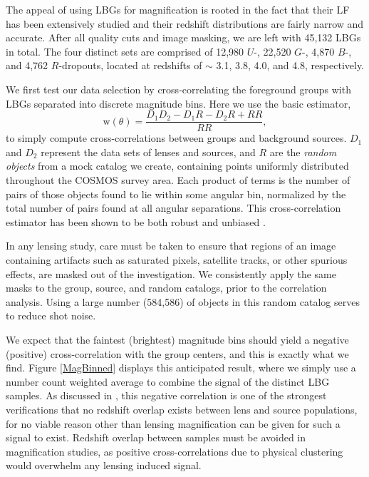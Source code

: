 The appeal of using \ac{LBG}s for magnification is rooted in the fact that their \acf{LF} has been extensively studied and their redshift distributions are fairly narrow and accurate.  After all quality cuts and image masking, we are left with 45,132 \ac{LBG}s in total.  The four distinct sets are comprised of 12,980 $U$-, 22,520 $G$-, 4,870 $B$-, and 4,762 $R$-dropouts, located at redshifts of $\sim$ 3.1, 3.8, 4.0, and 4.8, respectively.

We first test our data selection by cross-correlating the foreground groups with \ac{LBG}s separated into discrete magnitude bins. Here we use the basic \citet{LandySzalay93} estimator, 
\begin{equation}
\mathrm{w}(\theta)=\frac{D_1 D_2 - D_1 R - D_2 R + RR}{RR},
\end{equation}
to simply compute cross-correlations between groups and background sources. $D_1$ and $D_2$ represent the data sets of lenses and sources, and $R$ are the {\it random objects} from a mock catalog we create, containing points uniformly distributed throughout the \ac{COSMOS} survey area. Each product of terms is the number of pairs of those objects found to lie within some angular bin, normalized by the total number of pairs found at all angular separations.  This cross-correlation estimator has been shown to be both robust and unbiased \citep{Kerscher00}.  

In any lensing study, care must be taken to ensure that regions of an image containing artifacts such as saturated pixels, satellite tracks, or other spurious effects, are masked out of the investigation.  We consistently apply the same masks to the group, source, and random catalogs, prior to the correlation analysis. Using a large number (584,586) of objects in this random catalog serves to reduce shot noise.  

We expect that the faintest (brightest) magnitude bins should yield a negative (positive) cross-correlation with the group centers, and this is exactly what we find.  Figure \ref{MagBinned} displays this anticipated result, where we simply use a number count weighted average to combine the signal of the distinct \ac{LBG} samples.  As discussed in \citet{Hildebrandt09b}, this negative correlation is one of the strongest verifications that no redshift overlap exists between lens and source populations, for no viable reason other than lensing magnification can be given for such a signal to exist.  Redshift overlap between samples must be avoided in magnification studies, as positive cross-correlations due to physical clustering would overwhelm any lensing induced signal.

